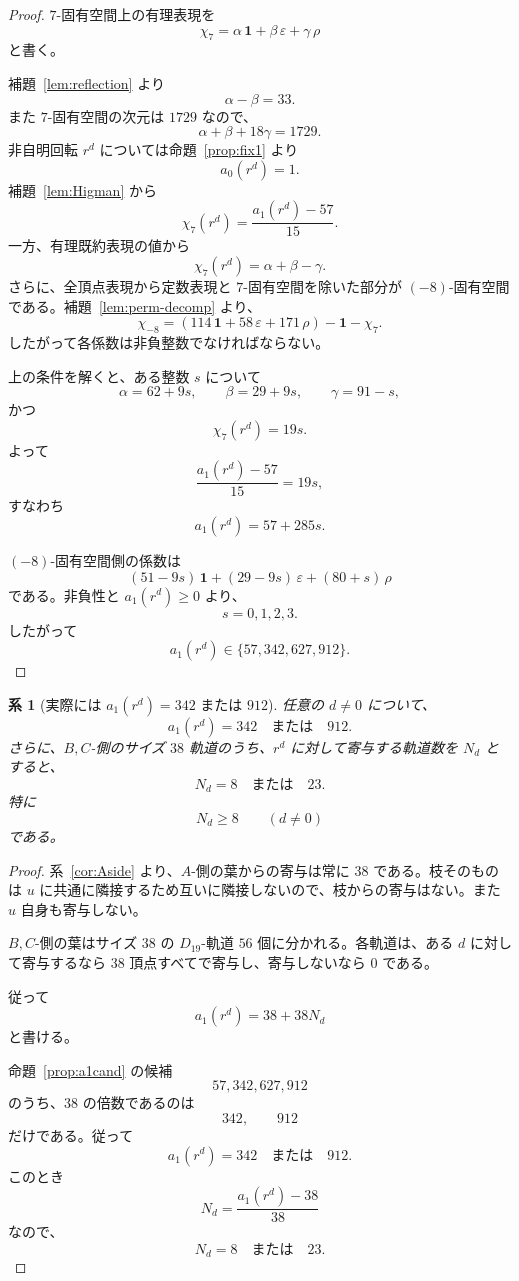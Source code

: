 \documentclass[11pt,a4paper]{article}
\theoremstyle{plain}
\newtheorem{corollary}[theorem]{系}
\theoremstyle{definition}
\theoremstyle{remark}
\begin{document}
\begin{proof}
$7$-固有空間上の有理表現を
\[
\chi_7 = \alpha\,\mathbf{1} + \beta\,\varepsilon + \gamma\,\rho
\]
と書く。

補題~\ref{lem:reflection} より
\[
\alpha - \beta = 33.
\]
また $7$-固有空間の次元は $1729$ なので、
\[
\alpha + \beta + 18\gamma = 1729.
\]
非自明回転 $r^d$ については命題~\ref{prop:fix1} より
\[
a_0(r^d) = 1.
\]
補題~\ref{lem:Higman} から
\[
\chi_7(r^d) = \frac{a_1(r^d) - 57}{15}.
\]
一方、有理既約表現の値から
\[
\chi_7(r^d) = \alpha + \beta - \gamma.
\]
さらに、全頂点表現から定数表現と $7$-固有空間を除いた部分が $(-8)$-固有空間である。補題~\ref{lem:perm-decomp} より、
\[
\chi_{-8} = (114\,\mathbf{1} + 58\,\varepsilon + 171\,\rho) - \mathbf{1} - \chi_7.
\]
したがって各係数は非負整数でなければならない。

上の条件を解くと、ある整数 $s$ について
\[
\alpha = 62 + 9s, \qquad \beta = 29 + 9s, \qquad \gamma = 91 - s,
\]
かつ
\[
\chi_7(r^d) = 19s.
\]
よって
\[
\frac{a_1(r^d) - 57}{15} = 19s,
\]
すなわち
\[
a_1(r^d) = 57 + 285s.
\]

$(-8)$-固有空間側の係数は
\[
(51 - 9s)\,\mathbf{1} + (29 - 9s)\,\varepsilon + (80 + s)\,\rho
\]
である。非負性と $a_1(r^d) \ge 0$ より、
\[
s = 0,1,2,3.
\]
したがって
\[
a_1(r^d) \in \{57, 342, 627, 912\}.
\]
\end{proof}

\begin{corollary}[実際には $a_1(r^d) = 342$ または $912$]\label{cor:a1real}
任意の $d \neq 0$ について、
\[
a_1(r^d) = 342 \quad\text{または}\quad 912.
\]
さらに、$B,C$-側のサイズ $38$ 軌道のうち、$r^d$ に対して寄与する軌道数を $N_d$ とすると、
\[
N_d = 8 \quad\text{または}\quad 23.
\]
特に
\[
N_d \ge 8 \qquad (d \neq 0)
\]
である。
\end{corollary}

\begin{proof}
系~\ref{cor:Aside} より、$A$-側の葉からの寄与は常に $38$ である。枝そのものは $u$ に共通に隣接するため互いに隣接しないので、枝からの寄与はない。また $u$ 自身も寄与しない。

$B,C$-側の葉はサイズ $38$ の $D_{19}$-軌道 $56$ 個に分かれる。各軌道は、ある $d$ に対して寄与するなら $38$ 頂点すべてで寄与し、寄与しないなら $0$ である。

従って
\[
a_1(r^d) = 38 + 38 N_d
\]
と書ける。

命題~\ref{prop:a1cand} の候補
\[
57, 342, 627, 912
\]
のうち、$38$ の倍数であるのは
\[
342, \qquad 912
\]
だけである。従って
\[
a_1(r^d) = 342 \quad\text{または}\quad 912.
\]
このとき
\[
N_d = \frac{a_1(r^d) - 38}{38}
\]
なので、
\[
N_d = 8 \quad\text{または}\quad 23.
\]
\end{proof}
\end{document}
